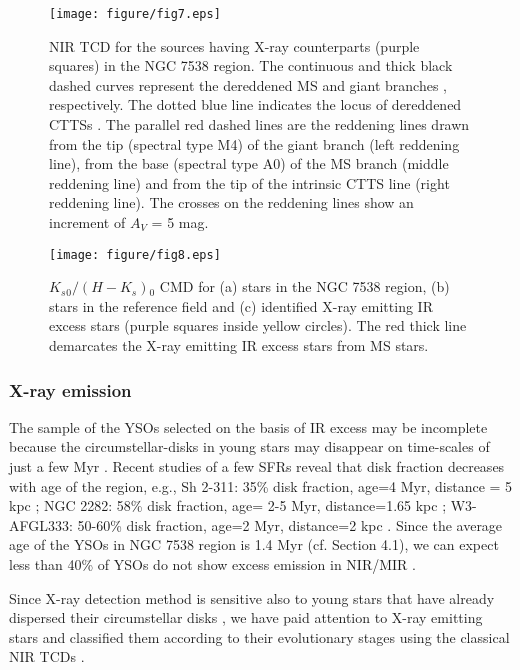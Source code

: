 \documentclass[a4paper,fleqn,usenatbib,useAMS]{mnras}
\begin{document}
\begin{figure}
\centering\texttt{[image: figure/fig7.eps]}
\caption{\label{nirccd} NIR TCD for the sources having X-ray counterparts (purple squares) in the NGC 7538 region. 
The continuous and thick black dashed curves represent the dereddened MS and giant branches \citep{1988PASP..100.1134B}, 
respectively. The dotted blue line indicates the locus of dereddened CTTSs \citep{1997AJ....114..288M}. 
The parallel red dashed lines are the reddening lines drawn from the tip (spectral type M4) of the 
giant branch (left reddening line), from the base (spectral type A0) of the MS branch (middle reddening
line) and from the tip of the intrinsic CTTS line (right reddening line). 
The crosses on the reddening lines show an increment of $A_V$ = 5 mag. }
\end{figure}

\begin{figure}
\centering\texttt{[image: figure/fig8.eps]}
\caption{\label{nirband} $K_s{_0}/(H-K_s){_0}$ CMD for (a) stars in the NGC 7538 region, (b) stars in the reference field
 and (c) identified X-ray emitting IR excess stars (purple squares inside yellow circles).
The red thick line demarcates the X-ray emitting IR excess stars from MS stars. }
\end{figure}

\subsubsection{X-ray emission\label{x-ray}}

The sample of the YSOs selected on the basis of IR excess may be incomplete because the circumstellar-disks
in young stars may disappear on time-scales of just a few Myr \citep[see][]{2007prpl.conf..345B}.
Recent studies of a few SFRs reveal that disk fraction decreases with age of the region, e.g., 
Sh 2-311: 35\% disk fraction, age=4 Myr, distance = 5 kpc \citep[][]{2016MNRAS.461.2502Y};
NGC 2282: 58\% disk fraction, age= 2-5 Myr, distance=1.65 kpc \citep[][]{2015MNRAS.454.3597D};
W3-AFGL333: 50-60\% disk fraction, age=2 Myr, distance=2 kpc \citep[][]{2016ApJ...822...49J}.
Since the average age of the YSOs in NGC 7538 region is 1.4 Myr (cf. Section 4.1), 
we can expect less than 40\% of YSOs do not show excess emission in NIR/MIR
\citep{2001ApJ...553L.153H,2008ApJ...686.1195H}.

Since X-ray detection method is sensitive also to young stars that have already 
dispersed their circumstellar disks \citep{2011AA...530A..34P},
we have  paid attention to X-ray emitting stars and 
classified them  according to their
evolutionary stages using the classical NIR TCDs 
\citep{2008MNRAS.384.1675J, 2008MNRAS.383.1241P, 2012PASJ...64..107S, 2014A&A...567A.109K}.
\end{document}
